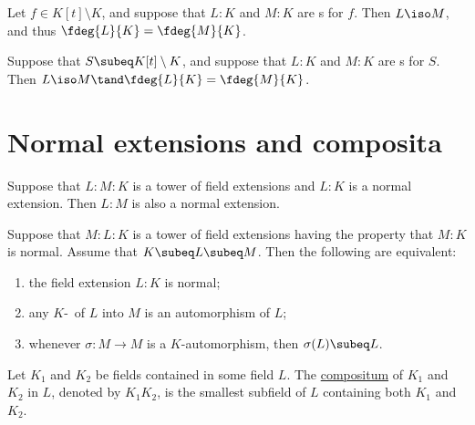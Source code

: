 \documentclass[a4paper]{article}
\begin{document}
\begin{ttheorem}
  Let \( f\in K[t]\setminus K \), and suppose that \( L:K \) and \( M:K \) are \sfe s for \( f \).
  Then \( L\iso M \), and thus \( \fdeg{L}{K}=\fdeg{M}{K} \).
\end{ttheorem}

\begin{ttheorem}
  Suppose that \( S\subeq K[t]\setminus K \), and suppose that \( L:K \) and \( M:K \) are \sfe s for \( S \).
  Then \( L\iso M\tand \fdeg{L}{K}=\fdeg{M}{K} \).
\end{ttheorem}

\section{Normal extensions and composita}

\begin{tproposition}
  Suppose that \( L:M:K \) is a tower of field extensions and \( L:K \) is a normal extension.
  Then \( L:M \) is also a normal extension.
\end{tproposition}

\begin{ttheorem}
  Suppose that \( M:L:K \) is a tower of field extensions having the property that \( M:K \) is normal.
  Assume that \( K\subeq L\subeq M \).
  Then the following are equivalent: \begin{enumerate}[label=(\roman*)]
    \item the field extension \( L:K \) is normal;
    \item any \( K \)-\homo~of \( L \) into \( M \) is an automorphism of \( L \);
    \item whenever \( \sigma:M\to M \) is a \( K \)-automorphism, then \( \sigma(L)\subeq L \).
  \end{enumerate}
\end{ttheorem}

\begin{tdefinition}[Compositum]
  Let \( K_1 \) and \( K_2 \) be fields contained in some field \( L \).
  The \ul{compositum} of \( K_1 \) and \( K_2 \) in \( L \), denoted by \( K_1K_2 \), is the smallest subfield of \( L \) containing both \( K_1 \) and \( K_2 \).
\end{tdefinition}
\end{document}
